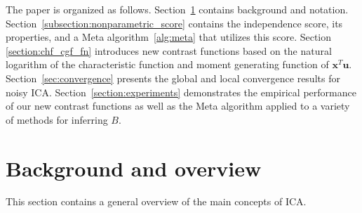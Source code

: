 \documentclass[letterpaper]{article}
\newcommand{\bu}{\pmb{u}}
\newcommand{\bx}{\pmb{x}}
\begin{document}

The paper is organized as follows. Section~\ref{sec:background} contains background and notation. Section~\ref{subsection:nonparametric_score} contains the independence score, its properties, and a Meta algorithm~\ref{alg:meta} that utilizes this score. %
Section \ref{section:chf_cgf_fn} introduces new contrast functions based on the natural logarithm of the characteristic function and moment generating function of $\bx^{T}\bu$. Section~\ref{sec:convergence} presents the global and local convergence results for noisy ICA. %
Section~\ref{section:experiments} demonstrates the empirical performance of our new contrast functions as well as the Meta algorithm applied to a variety of methods for inferring $B$.
\section{Background and overview}
\label{sec:background}
This section contains a general overview of the main concepts of ICA. %
\end{document}
